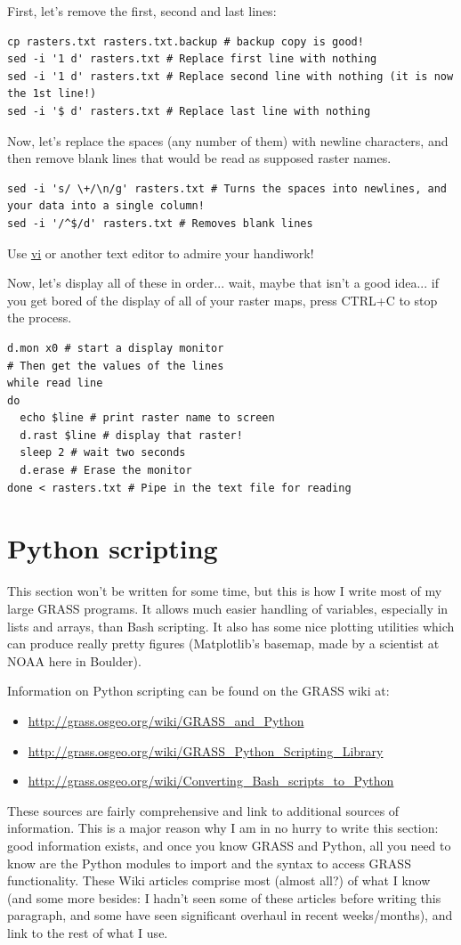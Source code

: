\documentclass{book}
\begin{document}
First, let's remove the first, second and last lines:
\begin{lstlisting}
cp rasters.txt rasters.txt.backup # backup copy is good!
sed -i '1 d' rasters.txt # Replace first line with nothing
sed -i '1 d' rasters.txt # Replace second line with nothing (it is now the 1st line!)
sed -i '$ d' rasters.txt # Replace last line with nothing
\end{lstlisting}

Now, let's replace the spaces (any number of them) with newline characters, and then remove blank lines that would be read as supposed raster names.
\begin{lstlisting}
sed -i 's/ \+/\n/g' rasters.txt # Turns the spaces into newlines, and your data into a single column!
sed -i '/^$/d' rasters.txt # Removes blank lines
\end{lstlisting}
Use \url{vi} or another text editor to admire your handiwork!

Now, let's display all of these in order... wait, maybe that isn't a good idea... if you get bored of the display of all of your raster maps, press CTRL+C to stop the process.
\begin{lstlisting}
d.mon x0 # start a display monitor
# Then get the values of the lines
while read line
do
  echo $line # print raster name to screen
  d.rast $line # display that raster!
  sleep 2 # wait two seconds
  d.erase # Erase the monitor
done < rasters.txt # Pipe in the text file for reading
\end{lstlisting}


\section{Python scripting \label{s:Python}}

This section won't be written for some time, but this is how I write most of my large GRASS programs. It allows much easier handling of variables, especially in lists and arrays, than Bash scripting. It also has some nice plotting utilities which can produce really pretty figures (Matplotlib's basemap, made by a scientist at NOAA here in Boulder).

Information on Python scripting can be found on the GRASS wiki at:
\begin{itemize}
 \item \url{http://grass.osgeo.org/wiki/GRASS_and_Python}
 \item \url{http://grass.osgeo.org/wiki/GRASS_Python_Scripting_Library}
 \item \url{http://grass.osgeo.org/wiki/Converting_Bash_scripts_to_Python}
\end{itemize}
These sources are fairly comprehensive and link to additional sources of information. This is a major  reason why I am in no hurry to write this section: good information exists, and once you know GRASS and Python, all you need to know are the Python modules to import and the syntax to access GRASS functionality. These Wiki articles comprise most (almost all?) of what I know (and some more besides: I hadn't seen some of these articles before writing this paragraph, and some have seen significant overhaul in recent weeks/months), and link to the rest of what I use.
\end{document}
